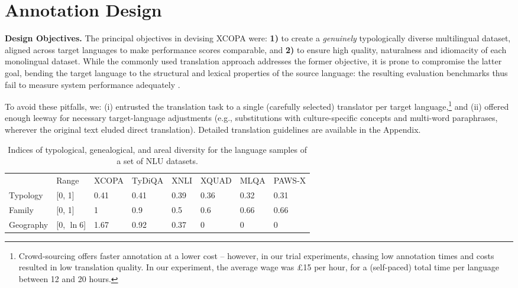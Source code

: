 \documentclass[11pt,a4paper]{article}
\newcommand{\ignore}[1]{}
\begin{document}
%
 
\section{Annotation Design}
\label{s:annotation}
\noindent \textbf{Design Objectives.}
The principal objectives in devising XCOPA were: \textbf{1)} to create a \emph{genuinely} typologically diverse multilingual dataset, aligned across target languages to make performance scores comparable, and \textbf{2)} to ensure high quality, naturalness and idiomacity of each monolingual dataset. While the commonly used translation approach addresses the former objective, 
it is prone to compromise the latter goal, bending the target language to the structural and lexical properties of the source language: the resulting evaluation benchmarks thus fail to 
measure system performance adequately \cite{koppel2011translationese,volansky2015features,artetxe2020translation,freitag2020bleu}.

To avoid these pitfalls, we: 
(i) entrusted the translation task to a single (carefully selected) translator per target language,\footnote{Crowd-sourcing offers faster annotation at a lower cost -- however, in our trial experiments, chasing low annotation times and costs resulted in low translation quality. In our experiment, the average wage was £15 per hour, for a (self-paced) total time per language between 12 and 20 hours.} and (ii) offered enough leeway for necessary target-language adjustments (e.g., substitutions with culture-specific concepts and multi-word paraphrases, wherever the original text eluded direct translation).\ignore{Allowing for language-specific modifications ensured that the output is natural and understandable to native speakers.} Detailed translation guidelines are available in the Appendix.



\begin{table*}[ht]
    \def\arraystretch{0.91}
    \centering
    {\small
    \begin{tabularx}{1.0\textwidth}{lY YYYYYY}
    \toprule
{} & Range & XCOPA & TyDiQA & XNLI & XQUAD & MLQA & PAWS-X \\
    \cmidrule(lr){3-8}
Typology & [0, 1] & {0.41} & {0.41} & 0.39 & 0.36 & 0.32 & 0.31 \\
Family & [0, 1] & {1} & 0.9 & 0.5  & 0.6 & 0.66 & 0.66 \\
Geography & [0, $\ln 6$] &  {1.67} & 0.92 & 0.37 & 0 & 0 & 0 \\

\bottomrule
    \end{tabularx}
    }\vspace{-1.5mm}
    \caption{Indices of typological, genealogical, and areal diversity for the language samples of a set of NLU datasets.}
    \label{tab:avgentropies}
    \vspace{-1.5mm}
\end{table*}
\end{document}
